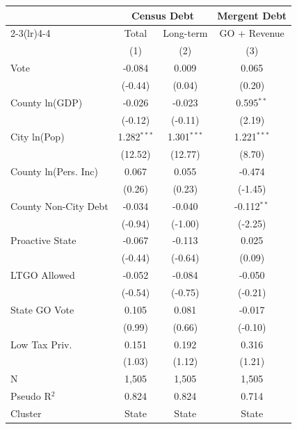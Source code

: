\begingroup
\centering
\begin{tabular*}{\textwidth}{@{\extracolsep{\fill}}lccc}
   \toprule
                        & \multicolumn{2}{c}{Census Debt} & \multicolumn{1}{c}{Mergent Debt}\\  
   \cmidrule(lr){2-3}\cmidrule(lr){4-4}
                        & Total             & Long-term             & GO + Revenue \\   
                        & (1)               & (2)                   & (3)\\  
   \midrule 
   Vote                 & -0.084            & 0.009                 & 0.065\\   
                        & (-0.44)          & (0.04)               & (0.20)\\   
   County ln(GDP)       & -0.026            & -0.023                & 0.595$^{**}$\\   
                        & (-0.12)          & (-0.11)              & (2.19)\\   
   City ln(Pop)         & 1.282$^{***}$     & 1.301$^{***}$         & 1.221$^{***}$\\   
                        & (12.52)          & (12.77)              & (8.70)\\   
   County ln(Pers. Inc) & 0.067             & 0.055                 & -0.474\\   
                        & (0.26)           & (0.23)               & (-1.45)\\   
   County Non-City Debt & -0.034            & -0.040                & -0.112$^{**}$\\   
                        & (-0.94)          & (-1.00)              & (-2.25)\\   
   Proactive State      & -0.067            & -0.113                & 0.025\\   
                        & (-0.44)          & (-0.64)              & (0.09)\\   
   LTGO Allowed         & -0.052            & -0.084                & -0.050\\   
                        & (-0.54)          & (-0.75)              & (-0.21)\\   
   State GO Vote        & 0.105             & 0.081                 & -0.017\\   
                        & (0.99)           & (0.66)               & (-0.10)\\   
   Low Tax Priv.        & 0.151             & 0.192                 & 0.316\\   
                        & (1.03)           & (1.12)               & (1.21)\\   
   \hline
   N         & 1,505             & 1,505                 & 1,505\\  
   Pseudo R$^2$         & 0.824             & 0.824                 & 0.714\\  
   Cluster              & State & State & State\\  
   \bottomrule
\end{tabular*}
\par\endgroup
